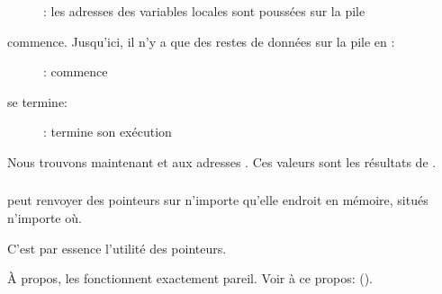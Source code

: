 \begin{figure}[H]
\centering
{}
\caption{\olly: les adresses des variables locales sont poussées sur la pile}
\label{fig:pointers_olly_stk_1}
\end{figure}

\clearpage
\ttfone commence.
Jusqu'ici, il n'y a que des restes de données sur la pile en \PtrsAddresses :

\begin{figure}[H]
\centering
{}
\caption{\olly: \ttfone commence}
\label{fig:pointers_olly_stk_2}
\end{figure}

\clearpage
\ttfone se termine:

\begin{figure}[H]
\centering
{}
\caption{\olly: \ttfone termine son exécution}
\label{fig:pointers_olly_stk_3}
\end{figure}

Nous trouvons maintenant  et  aux adresses \PtrsAddresses.
Ces valeurs sont les résultats de \ttfone.

\subsubsection{\Conclusion{}}
 
\ttfone peut renvoyer des pointeurs sur n'importe qu'elle endroit en mémoire, situés
n'importe où.

C'est par essence l'utilité des pointeurs.

À propos, les  \Cpp fonctionnent exactement pareil. Voir à ce propos:
().
